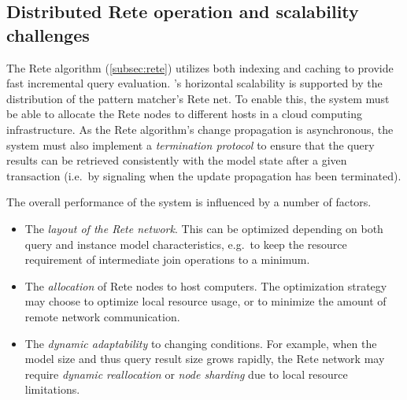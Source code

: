 % 





\subsection{Distributed Rete operation and scalability challenges}

The Rete algorithm (\autoref{subsec:rete}) utilizes both indexing and caching to provide fast incremental query evaluation. \iqd{}'s horizontal scalability is supported by the distribution of the pattern matcher's Rete net. To enable this, the system must be able to allocate the Rete nodes to different hosts in a cloud computing infrastructure. As the Rete algorithm's change propagation is asynchronous, the system must also implement a \emph{termination protocol} to ensure that the query results can be retrieved consistently with the model state after a given transaction (i.e.\ by signaling when the update propagation has been terminated).

The overall performance of the system is influenced by a number of factors.

\begin{itemize}
  \item The \emph{layout of the Rete network}. This can be optimized depending on both query and instance model characteristics, e.g.\ to keep the resource requirement of intermediate join operations to a minimum.
  \item The \emph{allocation} of Rete nodes to host computers. The optimization strategy may choose to optimize local resource usage, or to minimize the amount of remote network communication.
  \item The \emph{dynamic adaptability} to changing conditions. For example, when the model size and thus query result size grows rapidly, the Rete network may require \emph{dynamic reallocation} or \emph{node sharding} due to local resource limitations.
\end{itemize}


